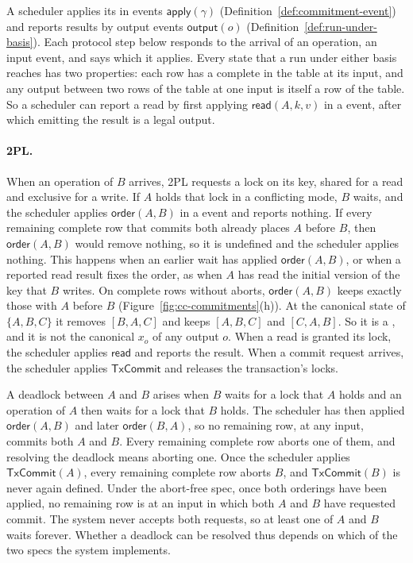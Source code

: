 A scheduler applies its \commitments in \commitment events
$\mathsf{apply}(\gamma)$ (Definition~\ref{def:commitment-event}) and reports
results by output events $\mathsf{output}(o)$
(Definition~\ref{def:run-under-basis}).  Each protocol step below responds to
the arrival of an operation, an input event, and says which \commitments it
applies.  Every state that a run under either basis reaches has two
properties: each row has a complete \outnoun in the table at its input, and
any output between two rows of the table at one input is itself a row of the
table.  So a scheduler can report a read by first applying
$\mathsf{read}(A,k,v)$ in a \commitment event, after which emitting the result
is a legal output.

\paragraph{2PL.}
When an operation of $B$ arrives, 2PL requests a lock on its key, shared for a
read and exclusive for a write.  If $A$ holds that lock in a conflicting mode,
$B$ waits, and the scheduler applies $\mathsf{order}(A,B)$ in a \commitment
event and reports nothing.  If every remaining complete row that commits both
already places $A$ before $B$, then $\mathsf{order}(A,B)$ would remove
nothing, so it is undefined and the scheduler applies nothing.  This happens
when an earlier wait has applied $\mathsf{order}(A,B)$, or when a reported
read result fixes the order, as when $A$ has read the initial version of the
key that $B$ writes.  On complete rows without aborts, $\mathsf{order}(A,B)$
keeps exactly those with $A$ before $B$ (Figure~\ref{fig:cc-commitments}(h)).
At the canonical state of $\{A,B,C\}$ it removes $[B,A,C]$ and keeps
$[A,B,C]$ and $[C,A,B]$.  So it is a \commitment, and it is not the canonical
\commitment $x_o$ of any output $o$.  When a read is granted its lock, the
scheduler applies $\mathsf{read}$ and reports the result.  When a commit
request arrives, the scheduler applies $\mathsf{TxCommit}$ and releases the
transaction's locks.

A deadlock between $A$ and $B$ arises when $B$ waits for a lock that $A$ holds
and an operation of $A$ then waits for a lock that $B$ holds.  The scheduler
has then applied $\mathsf{order}(A,B)$ and later $\mathsf{order}(B,A)$, so no
remaining row, at any input, commits both $A$ and $B$.  Every remaining
complete row aborts one of them, and resolving the deadlock means aborting
one.  Once the scheduler applies $\mathsf{TxCommit}(A)$, every remaining
complete row aborts $B$, and $\mathsf{TxCommit}(B)$ is never again defined.
Under the abort-free spec, once both orderings have been applied, no remaining
row is at an input in which both $A$ and $B$ have requested commit.  The
system never accepts both requests, so at least one of $A$ and $B$ waits
forever.  Whether a deadlock can be resolved thus depends on which of the two
specs the system implements.


